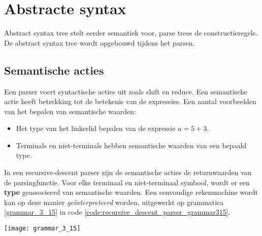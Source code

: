 \chapter{Abstracte syntax}
\label{ch:abstract_syntax}
Abstract syntax tree stelt eerder semantiek voor, parse trees de constructieregels. De abstract syntax tree wordt opgebouwd tijdens het parsen.
\section{Semantische acties}


Een parser voert syntactische acties uit zoals shift en reduce. Een semantische actie heeft betrekking tot de betekenis van de expressies. Een aantal voorbeelden van het bepalen van semantische waarden:
\begin{itemize}
	\item Het type van het linkerlid bepalen van de expressie $a = 5 + 3$.
	\item Terminals en niet-terminals hebben semantische waarden van een bepaald type.
\end{itemize}

In een recursive-descent parser zijn de semantische acties de returnwaarden van de parsingfunctie. Voor elke terminaal en niet-terminaal symbool, wordt er een \textbf{type} geassocieerd van semantische waarden. Een eenvoudige rekenmachine wordt kan op deze manier \textit{geïnterpreteerd} worden, uitgewerkt op grammatica \ref{grammar_3_15} in code \ref{code:recursive_descent_parser_grammar315}.
\begin{grammarfigure}
	\texttt{[image: grammar\_3\_15]}
	\caption{}
	\label{grammar_3_15}
\end{grammarfigure}


